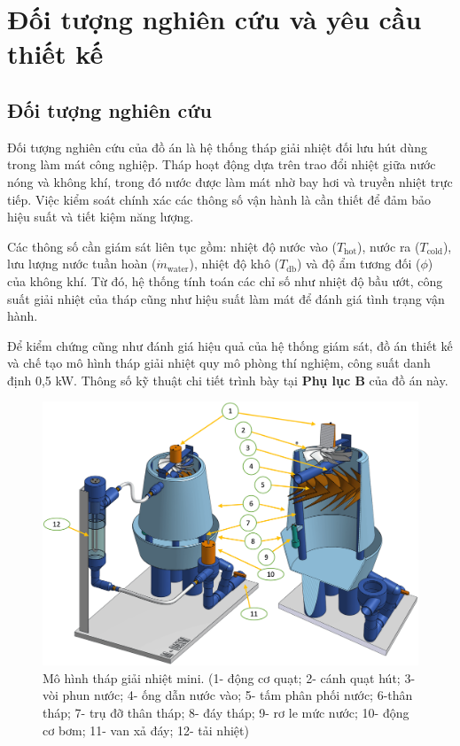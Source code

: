 \documentclass[../main.tex]{subfiles}
\begin{document}
\section{Đối tượng nghiên cứu và yêu cầu thiết kế}
\label{sec:system_design_implementation}

\subsection{Đối tượng nghiên cứu}
\label{sec:research_object}

Đối tượng nghiên cứu của đồ án là hệ thống tháp giải nhiệt đối lưu hút dùng trong làm mát công nghiệp. Tháp hoạt động dựa trên trao đổi nhiệt giữa nước nóng và không khí, trong đó nước được làm mát nhờ bay hơi và truyền nhiệt trực tiếp. Việc kiểm soát chính xác các thông số vận hành là cần thiết để đảm bảo hiệu suất và tiết kiệm năng lượng.

Các thông số cần giám sát liên tục gồm: nhiệt độ nước vào ($T_{\text{hot}}$), nước ra ($T_{\text{cold}}$), lưu lượng nước tuần hoàn ($\dot{m}_{\text{water}}$), nhiệt độ khô ($T_{\text{db}}$) và độ ẩm tương đối ($\phi$) của không khí. Từ đó, hệ thống tính toán các chỉ số như nhiệt độ bầu ướt, công suất giải nhiệt của tháp cũng như hiệu suất làm mát để đánh giá tình trạng vận hành.

Để kiểm chứng cũng như đánh giá hiệu quả của hệ thống giám sát, đồ án thiết kế và chế tạo mô hình tháp giải nhiệt quy mô phòng thí nghiệm, công suất danh định 0,5 kW. Thông số kỹ thuật chi tiết trình bày tại \textbf{Phụ lục B} của đồ án này.


\begin{figure} [H]
    \centering
    \includegraphics[width=1\textwidth]{Hinhve/chi_tiet_thap.png}
    \caption{Mô hình tháp giải nhiệt mini. (1- động cơ quạt; 2- cánh quạt hút; 3- vòi phun nước; 4- ống dẫn nước vào; 5- tấm phân phối nước; 6-thân tháp; 7- trụ đỡ thân tháp; 8- đáy tháp; 9- rơ le mức nước; 10- động cơ bơm; 11- van xả đáy; 12- tải nhiệt)}
    \label{fig:chi_tiet_thap}
\end{figure}
\end{document}
